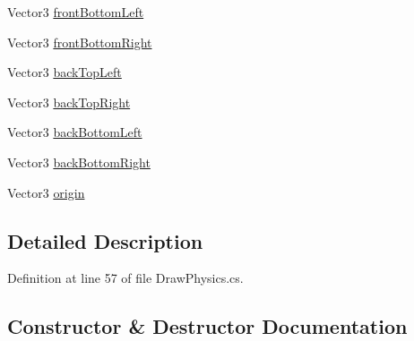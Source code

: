 \begin{DoxyCompactItemize}
\item 
Vector3 \mbox{\hyperlink{struct_ext_debug_1_1_box_a158d73c5de8b50f2e2dcc76dbf2884bb}{front\+Bottom\+Left}}
\item 
Vector3 \mbox{\hyperlink{struct_ext_debug_1_1_box_a366c36d4fd005218b5d641bf905ff880}{front\+Bottom\+Right}}
\item 
Vector3 \mbox{\hyperlink{struct_ext_debug_1_1_box_a6b42600a5855d1c46bf05fc81c76f6c3}{back\+Top\+Left}}
\item 
Vector3 \mbox{\hyperlink{struct_ext_debug_1_1_box_a711f3befb0e400e94aa15e71229b2834}{back\+Top\+Right}}
\item 
Vector3 \mbox{\hyperlink{struct_ext_debug_1_1_box_aa5b3bdbb2cdd4186f620d30719d9229d}{back\+Bottom\+Left}}
\item 
Vector3 \mbox{\hyperlink{struct_ext_debug_1_1_box_a06c6376ba6eb6ce9012bb9fbf5a8348d}{back\+Bottom\+Right}}
\item 
Vector3 \mbox{\hyperlink{struct_ext_debug_1_1_box_a51a1f8d9daa4658d72f41d37adf23e82}{origin}}
\end{DoxyCompactItemize}


\subsection{Detailed Description}


Definition at line 57 of file Draw\+Physics.\+cs.



\subsection{Constructor \& Destructor Documentation}
\mbox{\label{struct_ext_debug_1_1_box_a2eab3f266341758846183edf62bbe91d}} 
